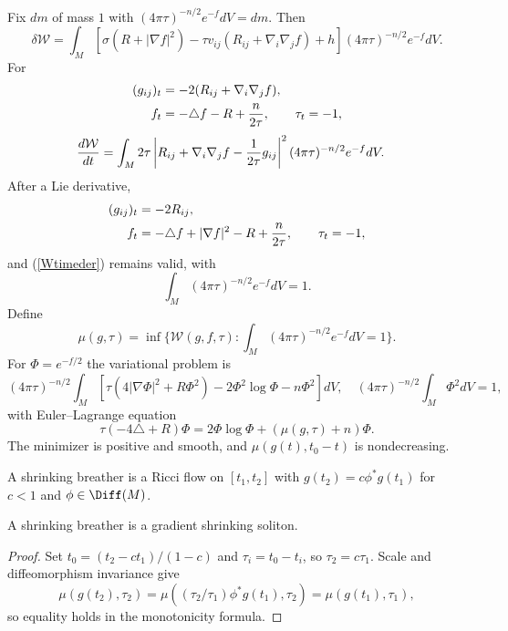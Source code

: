 Fix $dm$ of mass $1$ with $(4\pi\tau)^{-n/2}e^{-f}dV=dm$. Then
\begin{equation}\label{Wvar}
\delta {\mathcal W}=\int_M[\sigma(R+|\nabla f|^2)-\tau v_{ij}(R_{ij}+\nabla_i\nabla_jf)+h](4\pi\tau)^{-n/2}e^{-f}dV.
\end{equation}
For
\begin{align}\label{oldeqn}
(g_{ij})_t&=-2(R_{ij}+\nabla_i\nabla_jf),\\
f_t&=-\triangle f-R+{n\over2\tau},\qquad\tau_t=-1,\notag
\end{align}
\begin{align}\label{Wtimeder}
{d{\mathcal W}\over dt}&=\int_M2\tau\left|R_{ij}+\nabla_i\nabla_jf-{1\over2\tau}g_{ij}\right|^2(4\pi\tau)^{-n/2}e^{-f}dV.
\end{align}
After a Lie derivative,
\begin{align}\label{neweqn}
(g_{ij})_t&=-2R_{ij},\\
f_t&=-\triangle f+|\nabla f|^2-R+{n\over2\tau},\qquad\tau_t=-1,\notag
\end{align}
and (\ref{Wtimeder}) remains valid, with
\begin{equation}\label{Wnorm}\int_M(4\pi\tau)^{-n/2}e^{-f}dV=1.\end{equation}
Define
\begin{equation}
\mu(g,\tau)=\inf\{{\mathcal W}(g,f,\tau):\int_M(4\pi\tau)^{-n/2}e^{-f}dV=1\}.
\end{equation}
For $\Phi=e^{-f/2}$ the variational problem is
\begin{equation}
(4\pi\tau)^{-n/2}\int_M[\tau(4|\nabla\Phi|^2+R\Phi^2)-2\Phi^2\log\Phi-n\Phi^2]dV,
\quad(4\pi\tau)^{-n/2}\int_M\Phi^2dV=1,
\end{equation}
with Euler--Lagrange equation
\begin{equation}
\tau(-4\triangle+R)\Phi=2\Phi\log\Phi+(\mu(g,\tau)+n)\Phi.
\end{equation}
The minimizer is positive and smooth, and $\mu(g(t),t_0-t)$ is nondecreasing.

\begin{definition}
  \label{def:kl-w-entropy-shrinking-breather-definition}
A shrinking breather is a Ricci flow on $[t_1,t_2]$ with
$g(t_2)=c\phi^*g(t_1)$ for $c<1$ and $\phi\in\Diff(M)$.
\end{definition}
\begin{proposition}
  \label{prop:kl-w-entropy-rigidity-shrinking-breathers}
A shrinking breather is a gradient shrinking soliton.
\end{proposition}
\begin{proof}
\sketch
Set $t_0=(t_2-ct_1)/(1-c)$ and $\tau_i=t_0-t_i$, so $\tau_2=c\tau_1$. Scale and
diffeomorphism invariance give
\begin{equation}
\mu(g(t_2),\tau_2)=\mu((\tau_2/\tau_1)\phi^*g(t_1),\tau_2)=\mu(g(t_1),\tau_1),
\end{equation}
so equality holds in the monotonicity formula.
\end{proof}

